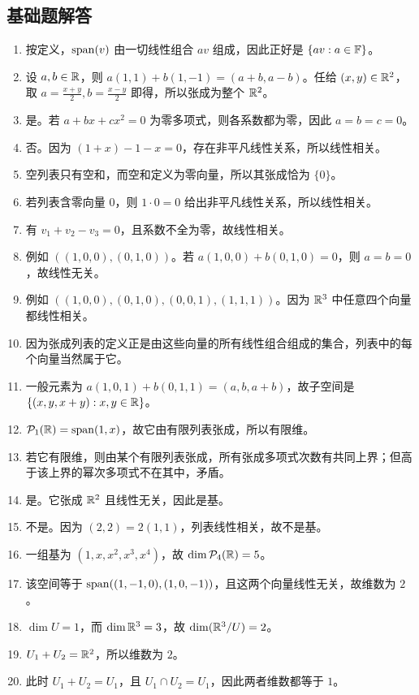 \subsection*{基础题解答}

\begin{enumerate}[label=\textbf{\basic\ \arabic*.}, leftmargin=3em]
\item 按定义，$\operatorname{span}(v)$ 由一切线性组合 $av$ 组成，因此正好是 $\{av:a\in\mathbb{F}\}$。
\item 设 $a,b\in\mathbb{R}$，则 $a(1,1)+b(1,-1)=(a+b,a-b)$。任给 $(x,y)\in\mathbb{R}^2$，取 $a=\frac{x+y}{2},b=\frac{x-y}{2}$ 即得，所以张成为整个 $\mathbb{R}^2$。
\item 是。若 $a+bx+cx^2=0$ 为零多项式，则各系数都为零，因此 $a=b=c=0$。
\item 否。因为 $(1+x)-1-x=0$，存在非平凡线性关系，所以线性相关。
\item 空列表只有空和，而空和定义为零向量，所以其张成恰为 $\{0\}$。
\item 若列表含零向量 $0$，则 $1\cdot 0=0$ 给出非平凡线性关系，所以线性相关。
\item 有 $v_1+v_2-v_3=0$，且系数不全为零，故线性相关。
\item 例如 $((1,0,0),(0,1,0))$。若 $a(1,0,0)+b(0,1,0)=0$，则 $a=b=0$，故线性无关。
\item 例如 $((1,0,0),(0,1,0),(0,0,1),(1,1,1))$。因为 $\mathbb{R}^3$ 中任意四个向量都线性相关。
\item 因为张成列表的定义正是由这些向量的所有线性组合组成的集合，列表中的每个向量当然属于它。
\item 一般元素为 $a(1,0,1)+b(0,1,1)=(a,b,a+b)$，故子空间是 $\{(x,y,x+y):x,y\in\mathbb{R}\}$。
\item $\mathcal{P}_1(\mathbb{R})=\operatorname{span}(1,x)$，故它由有限列表张成，所以有限维。
\item 若它有限维，则由某个有限列表张成，所有张成多项式次数有共同上界；但高于该上界的幂次多项式不在其中，矛盾。
\item 是。它张成 $\mathbb{R}^2$ 且线性无关，因此是基。
\item 不是。因为 $(2,2)=2(1,1)$，列表线性相关，故不是基。
\item 一组基为 $(1,x,x^2,x^3,x^4)$，故 $\dim\mathcal{P}_4(\mathbb{R})=5$。
\item 该空间等于 $\operatorname{span}((1,-1,0),(1,0,-1))$，且这两个向量线性无关，故维数为 $2$。
\item $\dim U=1$，而 $\dim\mathbb{R}^3=3$，故 $\dim(\mathbb{R}^3/U)=2$。
\item $U_1+U_2=\mathbb{R}^2$，所以维数为 $2$。
\item 此时 $U_1+U_2=U_1$，且 $U_1\cap U_2=U_1$，因此两者维数都等于 $1$。
\end{enumerate}

